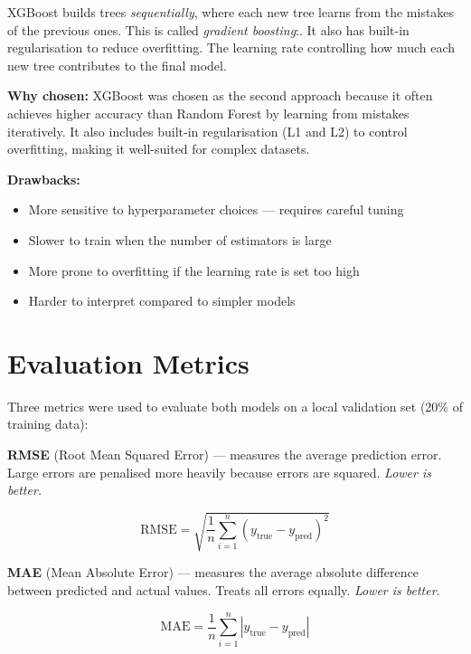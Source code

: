\documentclass[12pt, a4paper]{article}
\begin{document}
XGBoost builds trees \textit{sequentially}, where each new tree learns from the mistakes of the previous ones. This is called \textit{gradient boosting}:. It also has built-in regularisation to reduce overfitting. The learning rate controlling how much each new tree contributes to the final model.

\textbf{Why chosen:} XGBoost was chosen as the second approach because it often achieves higher accuracy than Random Forest by learning from mistakes iteratively. It also includes built-in regularisation (L1 and L2) to control overfitting, making it well-suited for complex datasets.

\textbf{Drawbacks:} 
\begin{itemize}
    \item More sensitive to hyperparameter choices — requires careful tuning
    \item Slower to train when the number of estimators is large
    \item More prone to overfitting if the learning rate is set too high
    \item Harder to interpret compared to simpler models
\end{itemize}

\section*{Evaluation Metrics}

Three metrics were used to evaluate both models on a local validation set (20\% of training data):

\textbf{RMSE} (Root Mean Squared Error) — measures the average prediction error. Large errors are penalised more heavily because errors are squared. \textit{Lower is better.}

\begin{equation*}
    \text{RMSE} = \sqrt{\frac{1}{n} \sum_{i=1}^{n} (y_{\text{true}} - y_{\text{pred}})^2}
\end{equation*}

\textbf{MAE} (Mean Absolute Error) — measures the average absolute difference between predicted and actual values. Treats all errors equally. \textit{Lower is better.}

\begin{equation*}
    \text{MAE} = \frac{1}{n} \sum_{i=1}^{n} |y_{\text{true}} - y_{\text{pred}}|
\end{equation*}
\end{document}
